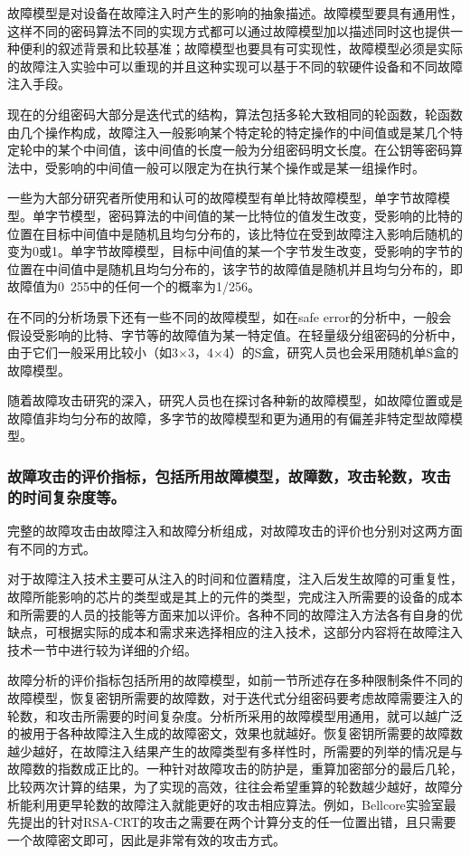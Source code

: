 \documentclass[a4paper,12pt]{article}
\begin{document}
\begin{CJK}{UTF8}{gkai}
故障模型是对设备在故障注入时产生的影响的抽象描述。故障模型要具有通用性，这样不同的密码算法不同的实现方式都可以通过故障模型加以描述同时这也提供一种便利的叙述背景和比较基准；故障模型也要具有可实现性，故障模型必须是实际的故障注入实验中可以重现的并且这种实现可以基于不同的软硬件设备和不同故障注入手段。

现在的分组密码大部分是迭代式的结构，算法包括多轮大致相同的轮函数，轮函数由几个操作构成，故障注入一般影响某个特定轮的特定操作的中间值或是某几个特定轮中的某个中间值，该中间值的长度一般为分组密码明文长度。在公钥等密码算法中，受影响的中间值一般可以限定为在执行某个操作或是某一组操作时。

一些为大部分研究者所使用和认可的故障模型有单比特故障模型，单字节故障模型。单字节模型，密码算法的中间值的某一比特位的值发生改变，受影响的比特的位置在目标中间值中是随机且均匀分布的，该比特位在受到故障注入影响后随机的变为0或1。单字节故障模型，目标中间值的某一个字节发生改变，受影响的字节的位置在中间值中是随机且均匀分布的，该字节的故障值是随机并且均匀分布的，即故障值为0~255中的任何一个的概率为1/256。

在不同的分析场景下还有一些不同的故障模型，如在safe  error的分析中，一般会假设受影响的比特、字节等的故障值为某一特定值。在轻量级分组密码的分析中，由于它们一般采用比较小（如3$\times$3，4$\times$4）的S盒，研究人员也会采用随机单S盒的故障模型。

随着故障攻击研究的深入，研究人员也在探讨各种新的故障模型，如故障位置或是故障值非均匀分布的故障，多字节的故障模型和更为通用的有偏差非特定型故障模型。

\subsubsection{故障攻击的评价指标，包括所用故障模型，故障数，攻击轮数，攻击的时间复杂度等。}
完整的故障攻击由故障注入和故障分析组成，对故障攻击的评价也分别对这两方面有不同的方式。

对于故障注入技术主要可从注入的时间和位置精度，注入后发生故障的可重复性，故障所能影响的芯片的类型或是其上的元件的类型，完成注入所需要的设备的成本和所需要的人员的技能等方面来加以评价。各种不同的故障注入方法各有自身的优缺点，可根据实际的成本和需求来选择相应的注入技术，这部分内容将在故障注入技术一节中进行较为详细的介绍。

故障分析的评价指标包括所用的故障模型，如前一节所述存在多种限制条件不同的故障模型，恢复密钥所需要的故障数，对于迭代式分组密码要考虑故障需要注入的轮数，和攻击所需要的时间复杂度。分析所采用的故障模型用通用，就可以越广泛的被用于各种故障注入生成的故障密文，效果也就越好。恢复密钥所需要的故障数越少越好，在故障注入结果产生的故障类型有多样性时，所需要的列举的情况是与故障数的指数成正比的。一种针对故障攻击的防护是，重算加密部分的最后几轮，比较两次计算的结果，为了实现的高效，往往会希望重算的轮数越少越好，故障分析能利用更早轮数的故障注入就能更好的攻击相应算法。例如，Bellcore实验室最先提出的针对RSA-CRT的攻击之需要在两个计算分支的任一位置出错，且只需要一个故障密文即可，因此是非常有效的攻击方式。


\end{CJK}
\end{document}
